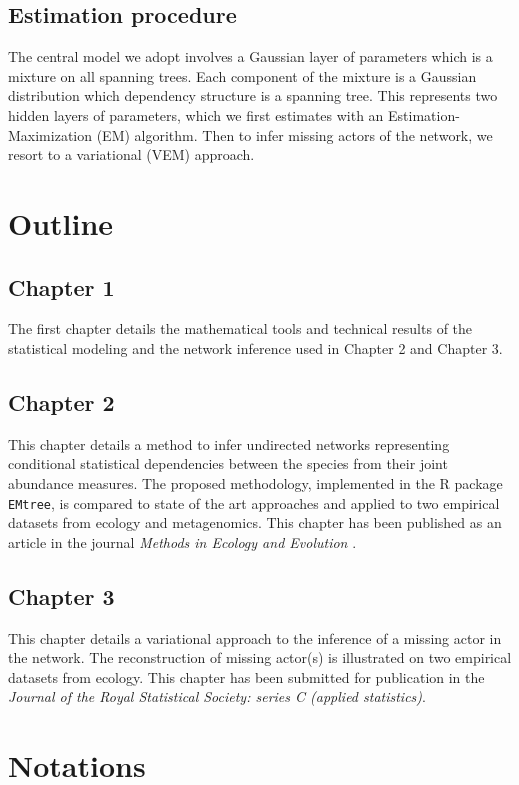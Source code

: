  
 \subsection*{Estimation procedure} %
The central model we adopt involves a Gaussian layer of parameters which is a mixture on all spanning trees. Each component of the mixture is a Gaussian distribution which dependency structure is a spanning tree. This represents two hidden layers of parameters, which we first estimates with an Estimation-Maximization (EM) algorithm. Then to infer missing actors of the network, we resort to a variational (VEM) approach.

\section*{Outline} 
  \subsection*{Chapter 1}
The first chapter details the mathematical tools and technical results of the statistical modeling and the network inference used in Chapter 2 and Chapter 3.

   \subsection*{Chapter 2}
   This chapter details a method to infer undirected networks representing conditional statistical dependencies between the species from their joint abundance measures.  The proposed methodology, implemented in the R package \texttt{EMtree},  is compared to state of the art approaches and applied to two empirical datasets from ecology and metagenomics. This chapter has been published as an article in the journal \textit{Methods in Ecology and Evolution} \citep{MRA20}.
   
    \subsection*{Chapter 3}
This chapter details a variational approach to the inference of a missing actor in the network. The reconstruction of missing actor(s) is illustrated on two  empirical datasets from ecology. This chapter has been submitted for publication in the \textit{Journal of the Royal Statistical Society: series C (applied statistics)}.
 
 
 \section*{Notations}